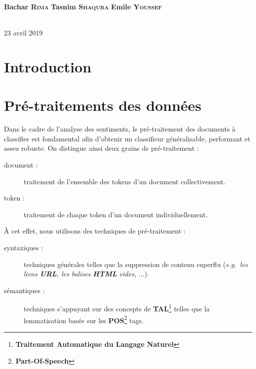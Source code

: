 \documentclass[12pt,a4paper]{report}
\theoremstyle{definition}
\begin{document}
\begin{titlepage}
\begin{minipage}{0.4\textwidth}
\centering \Large
\textbf{Bachar \textsc{Rima}} %
\textbf{Tasnim \textsc{Shaqura}} %
\textbf{Emile \textsc{Youssef}} %
\end{minipage} \\[0.8cm]

{\large 23 avril 2019}\\[1cm]
\hspace{\fill}
\vfill %
\end{titlepage}

\tableofcontents
\cleardoublepage

\setcounter{page}{1}
\chapter{Introduction}

\chapter{Pré-traitements des données}
Dans le cadre de l'analyse des sentiments, le pré-traitement des documents à classifier est fondamental afin d'obtenir un classifieur généralisable, performant et assez robuste. On distingue ainsi deux grains de pré-traitement :
\begin{description}
  \item [document :] traitement de l'ensemble des tokens d'un document collectivement.
  \item [token :] traitement de chaque token d'un document individuellement.
\end{description}

À cet effet, nous utilisons des techniques de pré-traitement :
\begin{description}
  \item [syntaxiques :] techniques générales telles que la suppression de contenu superflu (\emph{e.g.~les liens \textbf{URL}, les balises \textbf{HTML} vides, $\dots$}).
  \item [sémantiques :] techniques s'appuyant sur des concepts de \textbf{TAL}\footnote{\textbf{Traitement Automatique du Langage Naturel}} telles que la lemmatisation basée sur les \textbf{POS}\footnote{\textbf{Part-Of-Speech}} tags.
\end{description}
\end{document}
